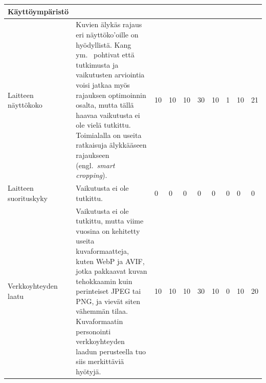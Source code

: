 \documentclass[finnish, 12pt, a4paper, elec, utf8, a-1b, online]{aaltothesis}
\begin{document}
{\begin{longtable}{p{2.5cm}|p{6cm}|p{0.5cm}p{0.5cm}p{0.5cm}|p{0.5cm}|p{0.5cm}p{0.5cm}p{0.5cm}|p{0.5cm}|}
    \midrule
    \textbf{Käyttöympäristö}                                                                                                                                                                                                                                                                                                                                                                                                                                                                                                                                                                                                                                                                                                                           \\
    \midrule
    Laitteen näyttökoko                    & Kuvien älykäs rajaus eri näyttöko'oille on hyödyllistä. Kang ym.~\cite{5539850} pohtivat että tutkimusta ja vaikutusten arviointia voisi jatkaa myös rajauksen optimoinnin osalta, mutta tällä haavaa vaikutusta ei ole vielä tutkittu. Toimialalla on useita ratkaisuja älykkääseen rajaukseen (engl.~\textit{smart cropping}).                                      & 10                                         & 10                                  & 10                                     & 30                           & 10                                              & 1                                         & 10                                        & 21                           \\
    \midrule
    Laitteen suorituskyky                  & Vaikutusta ei ole tutkittu.                                                                                                                                                                                                                                                                                                                                           & 0                                          & 0                                   & 0                                      & 0                            & 0                                               & 0                                         & 0                                         & 0                            \\
    \midrule
    Verkkoyhteyden laatu                   & Vaikutusta ei ole tutkittu, mutta viime vuosina on kehitetty useita kuvaformaatteja, kuten WebP ja AVIF, jotka pakkaavat kuvan tehokkaamin kuin perinteiset JPEG tai PNG, ja vievät siten vähemmän tilaa. Kuvaformaatin personointi verkkoyhteyden laadun perusteella tuo siis merkittäviä hyötyjä.                                                                   & 10                                         & 10                                  & 10                                     & 30                           & 10                                              & 0                                         & 10                                        & 20                           \\

\end{longtable}}
\end{document}
